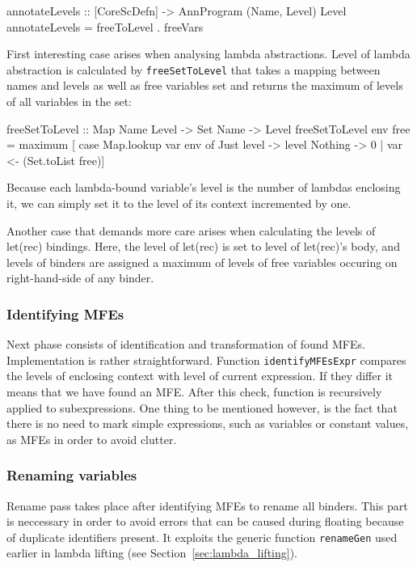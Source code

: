 \documentclass[12pt,a4paper]{report}
\begin{document}
\vspace*{0.2in}
\begin{code}[style=haskell]
annotateLevels :: [CoreScDefn] -> AnnProgram (Name, Level) Level
annotateLevels = freeToLevel . freeVars
\end{code}

First interesting case arises when analysing lambda abstractions. Level of
lambda abstraction is calculated by \texttt{freeSetToLevel} that takes a
mapping between names and levels as well as free variables set and returns the
maximum of levels of all variables in the set:

\vspace*{0.2in}
\begin{code}[style=haskell]
freeSetToLevel :: Map Name Level -> Set Name -> Level
freeSetToLevel env free =
    maximum [ case Map.lookup var env of
        Just level -> level
        Nothing -> 0 | var <- (Set.toList free)]
\end{code}

Because each lambda-bound variable's level is the number of lambdas enclosing
it, we can simply set it to the level of its context incremented by one.

Another case that demands more care arises when calculating the levels of
let(rec) bindings. Here, the level of let(rec) is set to level of let(rec)'s
body, and levels of binders are assigned a maximum of levels of free variables
occuring on right-hand-side of any binder.

\subsubsection{Identifying MFEs}
Next phase consists of identification and transformation of found MFEs.
Implementation is rather straightforward. Function \texttt{identifyMFEsExpr}
compares the levels of enclosing context with level of current expression. If
they differ it means that we have found an MFE. After this check, function is
recursively applied to subexpressions. One thing to be mentioned however, is
the fact that there is no need to mark simple expressions, such as variables or
constant values, as MFEs in order to avoid clutter.

\subsubsection{Renaming variables}
Rename pass takes place after identifying MFEs to rename all binders. This
part is neccessary in order to avoid errors that can be caused during floating
because of duplicate identifiers present. It exploits the generic function
\texttt{renameGen} used earlier in lambda lifting (see
Section~\ref{sec:lambda_lifting}).
\end{document}

